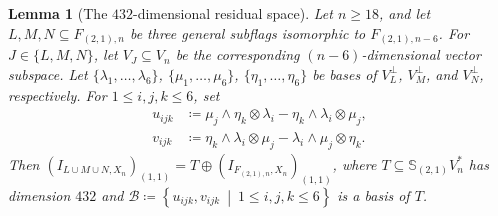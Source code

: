 \documentclass[a4paper,reqno]{amsart}
\theoremstyle{plainnopunct}
\newtheorem{lemma}[lemma]{Lemma}
\theoremstyle{definitionnopunct}
\renewcommand{\S}{\mathbb{S}}
\begin{document}
\begin{lemma}[The $432$-dimensional residual space]
\label{lemmabasis}
Let $n\geq18$, and let $L,M,N\subseteq F_{(2,1),n}$ be three general subflags isomorphic to $F_{(2,1),n-6}$.
For $J\in\{L,M,N\}$, let $V_J\subseteq V_n$ be the corresponding
$(n-6)$-dimensional vector subspace. Let $\{\lambda_1,\ldots,\lambda_6\}$, $\{\mu_1,\ldots,\mu_6\}$, $\{\eta_1,\ldots,\eta_6\}$ be bases of $V_L^\perp$, $V_M^\perp$, and $V_N^\perp$, respectively.
For $1\leq i,j,k\leq6$, set
\[
\begin{aligned}
u_{ijk}
&\coloneq
\mu_j\wedge\eta_k\otimes\lambda_i
-
\eta_k\wedge\lambda_i\otimes\mu_j,
\\
v_{ijk}
&\coloneq
\eta_k\wedge\lambda_i\otimes\mu_j
-
\lambda_i\wedge\mu_j\otimes\eta_k.
\end{aligned}
\]
Then
$
\left(
I_{L\cup M\cup N,X_n}
\right)_{(1,1)}
=
T
\oplus
\left(
I_{F_{(2,1),n},X_n}
\right)_{(1,1)}$,
where $T\subseteq\S_{(2,1)}V_n^*$ has dimension $432$ and
$
\mathcal B
\coloneq
\left\{
u_{ijk},v_{ijk}
\ \middle|\
1\leq i,j,k\leq6
\right\}$
is a basis of $T$.
\end{lemma}
\end{document}
